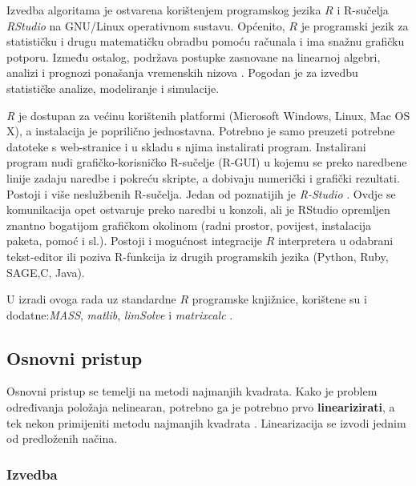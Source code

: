 \documentclass[a4paper,twoside,12pt]{memoir} %
\begin{document}
Izvedba algoritama je ostvarena korištenjem programskog jezika $R$ \cite{ref:24} i R-sučelja \textit{RStudio} na GNU/Linux operativnom sustavu.
Općenito, $R$ je programski jezik za statističku i drugu matematičku obradbu pomoću računala i ima snažnu grafičku potporu.
Između ostalog, podržava postupke zasnovane na linearnoj algebri, analizi i prognozi ponašanja vremenskih nizova \cite{ref:22}.
Pogodan je za izvedbu statističke analize, modeliranje i simulacije.

\textit{R} je dostupan za većinu korištenih platformi (Microsoft Windows, Linux, Mac OS X), a instalacija je poprilično jednostavna.
Potrebno je samo preuzeti potrebne datoteke s web-stranice \cite{Rsite} i u skladu s njima instalirati program.
Instalirani program nudi grafičko-korisničko R-sučelje (R-GUI) u kojemu se preko naredbene linije zadaju naredbe i pokreću skripte, a dobivaju numerički i grafički rezultati.
Postoji i više neslužbenih R-sučelja. Jedan od poznatijih je \textit{R-Studio} \cite{RStudio}.
Ovdje se komunikacija opet ostvaruje preko naredbi u konzoli, ali je RStudio opremljen znantno bogatijom grafičkom okolinom (radni prostor, povijest, instalacija paketa, pomoć i sl.).
Postoji i mogućnost integracije $R$ interpretera u odabrani tekst-editor ili poziva R-funkcija iz drugih programskih jezika (Python, Ruby, SAGE,C, Java).

U izradi ovoga rada uz standardne $R$ programske knjižnice, korištene su i dodatne:\textit{MASS}, \textit{matlib}, \textit{limSolve} i \textit{matrixcalc} \cite{ref:6,ref:8,ref:22}.

\subsection{Osnovni pristup}
Osnovni pristup se temelji na metodi najmanjih kvadrata. Kako je problem određivanja položaja nelinearan, potrebno ga je potrebno prvo \textbf{linearizirati}, a tek nekon primijeniti metodu najmanjih kvadrata \cite{googleSchoolar1}.
Linearizacija se izvodi jednim od predloženih načina.\\

\subsubsection{Izvedba}
\end{document}

